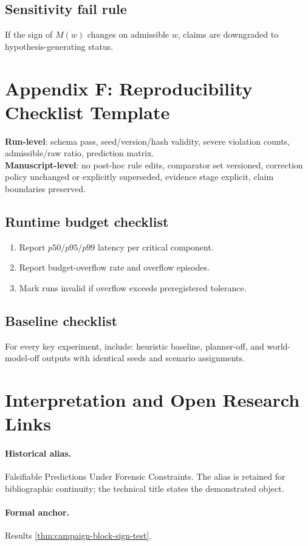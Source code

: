 \documentclass[11pt,a4paper]{article}
\theoremstyle{definition}
\begin{document}
\subsection*{Sensitivity fail rule}
If the sign of $M(w)$ changes on admissible $w$, claims are downgraded to hypothesis-generating status.

\section{Appendix F: Reproducibility Checklist Template}
\textbf{Run-level}: schema pass, seed/version/hash validity, severe violation counts, admissible/raw ratio, prediction matrix.\\
\textbf{Manuscript-level}: no post-hoc rule edits, comparator set versioned, correction policy unchanged or explicitly superseded, evidence stage explicit, claim boundaries preserved.
\subsection*{Runtime budget checklist}
\begin{enumerate}
\item Report $p50/p95/p99$ latency per critical component.
\item Report budget-overflow rate and overflow episodes.
\item Mark runs invalid if overflow exceeds preregistered tolerance.
\end{enumerate}
\subsection*{Baseline checklist}
For every key experiment, include: heuristic baseline, planner-off, and world-model-off outputs with identical seeds and scenario assignments.

\nocite{paper1,paper2,paper3,holm,efron}
\section{Interpretation and Open Research Links}\label{sec:interpretation-open-links}
\paragraph{Historical alias.} Falsifiable Predictions Under Forensic Constraints. The alias is retained for bibliographic continuity; the technical title states the demonstrated object.

\paragraph{Formal anchor.} Results \ref{thm:campaign-block-sign-test}.
\end{document}
